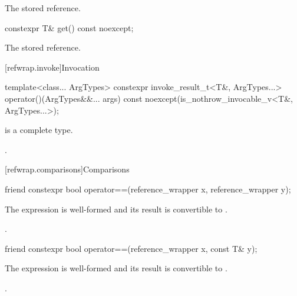 \begin{itemdescr}
\pnum
\returns
The stored reference.
\end{itemdescr}

%
\begin{itemdecl}
constexpr T& get() const noexcept;
\end{itemdecl}

\begin{itemdescr}
\pnum
\returns
The stored reference.
\end{itemdescr}

[refwrap.invoke]{Invocation}

%
\begin{itemdecl}
template<class... ArgTypes>
  constexpr invoke_result_t<T&, ArgTypes...>
    operator()(ArgTypes&&... args) const noexcept(is_nothrow_invocable_v<T&, ArgTypes...>);
\end{itemdecl}

\begin{itemdescr}
\pnum
\mandates
{} is a complete type.

\pnum
\returns
{}.
\end{itemdescr}

[refwrap.comparisons]{Comparisons}

\begin{itemdecl}
friend constexpr bool operator==(reference_wrapper x, reference_wrapper y);
\end{itemdecl}

\begin{itemdescr}
\pnum
\constraints
The expression  is well-formed and
its result is convertible to .

\pnum
\returns
{}.
\end{itemdescr}

\begin{itemdecl}
friend constexpr bool operator==(reference_wrapper x, const T& y);
\end{itemdecl}

\begin{itemdescr}
\pnum
\constraints
The expression  is well-formed and
its result is convertible to .

\pnum
\returns
{}.
\end{itemdescr}

